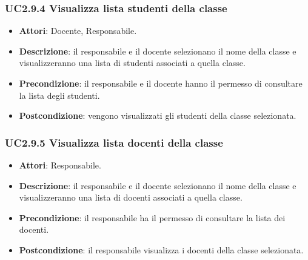 \subsubsection{UC2.9.4 Visualizza lista studenti della classe}
\begin{itemize}
\item \textbf{Attori}: Docente, Responsabile.
\item \textbf{Descrizione}: il responsabile e il docente selezionano il nome della classe e visualizzeranno una lista di studenti associati a quella classe.
\item \textbf{Precondizione}: il responsabile e il docente hanno il permesso di consultare la lista degli studenti.
\item \textbf{Postcondizione}: vengono visualizzati gli studenti della classe selezionata.
\end{itemize}
\subsubsection{UC2.9.5 Visualizza lista docenti della classe}
\begin{itemize}
\item \textbf{Attori}: Responsabile.
\item \textbf{Descrizione}: il responsabile e il docente selezionano il nome della classe e visualizzeranno una lista di docenti associati a quella classe.
\item \textbf{Precondizione}: il responsabile ha il permesso di consultare la lista dei docenti.
\item \textbf{Postcondizione}: il responsabile visualizza i docenti della classe selezionata.
\end{itemize}
